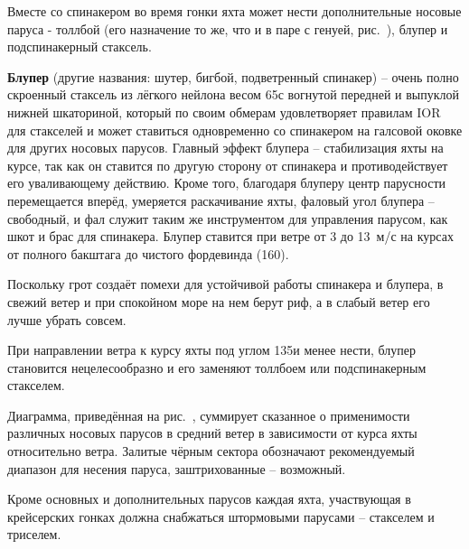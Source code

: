 Вместе со спинакером во время гонки яхта может нести дополнительные
носовые паруса - толлбой (его назначение то же, что и в паре с генуей,
рис.~), блупер и подспинакерный стаксель.

\textbf{Блупер}
(другие названия: шутер, бигбой, подветренный спинакер) \--- очень
полно скроенный стаксель из лёгкого нейлона весом 65\gmsq с вогнутой
передней и выпуклой нижней шкаториной, который по своим обмерам
удовлетворяет правилам IOR для стакселей и может ставиться
одновременно со спинакером на галсовой оковке для других носовых
парусов. Главный эффект блупера \--- стабилизация яхты на курсе, так
как он ставится по другую сторону от спинакера и противодействует его
уваливающему действию. Кроме того, благодаря блуперу центр парусности
перемещается вперёд, умеряется раскачивание яхты, фаловый угол блупера
\--- свободный, и фал служит таким же инструментом для управления
парусом, как шкот и брас для спинакера. Блупер ставится при ветре от 3
до 13~м/с на курсах от полного бакштага до чистого фордевинда
(160\gr).
 
Поскольку грот создаёт помехи для устойчивой работы спинакера и
блупера, в свежий ветер и при спокойном море на нем берут риф, а в
слабый ветер его лучше убрать совсем.

При направлении ветра к курсу яхты под углом 135\gr и менее нести,
блупер становится нецелесообразно и его заменяют толлбоем или
подспинакерным стакселем.
 
Диаграмма, приведённая на рис.~, суммирует сказанное о
применимости различных носовых парусов в средний ветер в зависимости
от курса яхты относительно ветра. Залитые чёрным сектора обозначают
рекомендуемый диапазон для несения паруса, заштрихованные \---
возможный.

Кроме основных и дополнительных парусов каждая яхта, участвующая в
крейсерских гонках должна снабжаться штормовыми парусами \---
стакселем и триселем.

